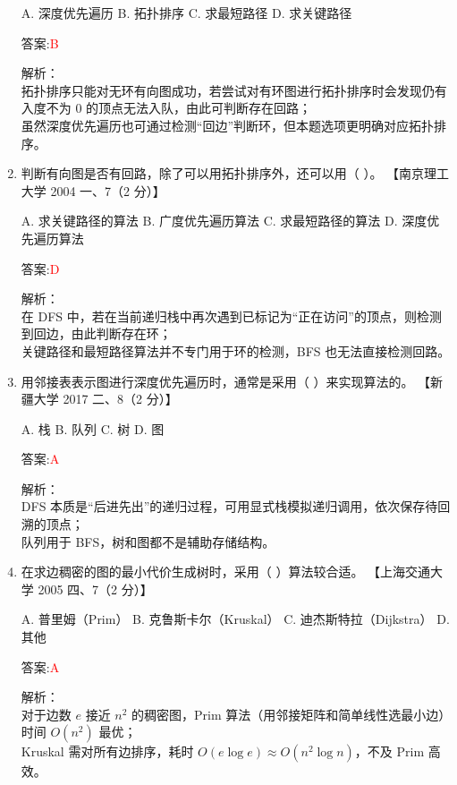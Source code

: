 \documentclass[lang=cn,newtx,10pt,scheme=chinese]{../../../elegantbook}
\begin{document}
\begin{enumerate}
    A. 深度优先遍历  
    B. 拓扑排序  
    C. 求最短路径  
    D. 求关键路径

    答案:\textcolor{red}{B}

    解析：\\
    拓扑排序只能对无环有向图成功，若尝试对有环图进行拓扑排序时会发现仍有入度不为 0 的顶点无法入队，由此可判断存在回路；\\
    虽然深度优先遍历也可通过检测“回边”判断环，但本题选项更明确对应拓扑排序。\\

\item 判断有向图是否有回路，除了可以用拓扑排序外，还可以用（ ）。  
    【南京理工大学 2004 一、7（2 分）】

    A. 求关键路径的算法  
    B. 广度优先遍历算法  
    C. 求最短路径的算法  
    D. 深度优先遍历算法

    答案:\textcolor{red}{D}

    解析：\\
    在 DFS 中，若在当前递归栈中再次遇到已标记为“正在访问”的顶点，则检测到回边，由此判断存在环；\\
    关键路径和最短路径算法并不专门用于环的检测，BFS 也无法直接检测回路。\\

\item 用邻接表表示图进行深度优先遍历时，通常是采用（  ）来实现算法的。  
    【新疆大学 2017 二、8（2 分）】

    A. 栈  
    B. 队列  
    C. 树  
    D. 图

    答案:\textcolor{red}{A}

    解析：\\
    DFS 本质是“后进先出”的递归过程，可用显式栈模拟递归调用，依次保存待回溯的顶点；\\
    队列用于 BFS，树和图都不是辅助存储结构。\\

\item 在求边稠密的图的最小代价生成树时，采用（  ）算法较合适。  
    【上海交通大学 2005 四、7（2 分）】

    A. 普里姆（Prim）  
    B. 克鲁斯卡尔（Kruskal）  
    C. 迪杰斯特拉（Dijkstra）  
    D. 其他

    答案:\textcolor{red}{A}

    解析：\\
    对于边数 $e$ 接近 $n^2$ 的稠密图，Prim 算法（用邻接矩阵和简单线性选最小边）时间 $O(n^2)$ 最优；\\
    Kruskal 需对所有边排序，耗时 $O(e\log e)\approx O(n^2\log n)$，不及 Prim 高效。\\


\end{enumerate}
\end{document}
